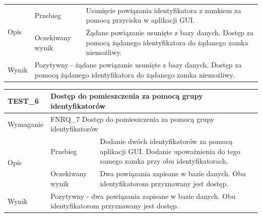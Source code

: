 \begin{table}[h!]
\begin{subtable}[c]{\textwidth}
\begin{tabular}{p{2cm}|p{}|p{}}
                    \multirow{2}{*}{Opis} & Przebieg           & Usunięcie powiązania identyfikatora z zamkiem za pomocą przycisku w aplikacji GUI.  \\ \cline{2-3}
                                          & Oczekiwany wynik   & Żądane powiązanie usunięte z bazy danych. Dostęp za pomocą żądanego identyfikatora do żądanego zamka niemożliwy.                                                 \\ \hline
                    Wynik                 & \multicolumn{2}{p{12cm}}{Pozytywny - żądane powiązanie usunięte z bazy danych. Dostęp za pomocą żądanego identyfikatora do żądanego zamka niemożliwy.} \\
                    \end{tabular}%
                \label{tbl:test5}
                \vspace{10mm}
            \end{subtable}
        \quad%
            \begin{subtable}[c]{\textwidth}
                \centering
                    \begin{tabular}{p{2cm}|p{}|p{}}
                    TEST\_6               & \multicolumn{2}{p{12cm}}{\textbf{Dostęp do pomieszczenia za pomocą grupy identyfikatorów}}                                                            \\ \hline
                    Wymaganie             & \multicolumn{2}{p{12cm}}{FNRQ\_7 Dostęp do pomieszczenia za pomocą grupy identyfikatorów }                                                                                    \\ \hline
                    \multirow{2}{*}{Opis} & Przebieg           & Dodanie dwóch identyfikatorów za pomocą aplikacji GUI. Dodanie upoważnienia do tego samego zamka przy obu identyfikatorach.  \\ \cline{2-3}
                                         & Oczekiwany wynik   & Dwa powiązania zapisane w bazie danych. Obu identyfikatorom przyznawany jest dostęp.                                                 \\ \hline
                    Wynik                 & \multicolumn{2}{p{12cm}}{Pozytywny - dwa powiązania zapisane w bazie danych. Obu identyfikatorom przyznawany jest dostęp.} \\
                    \end{tabular}%
                \label{tbl:test6}
                \vspace{10mm}
            \end{subtable}
            \label{tbl:tests}
        \end{table}

